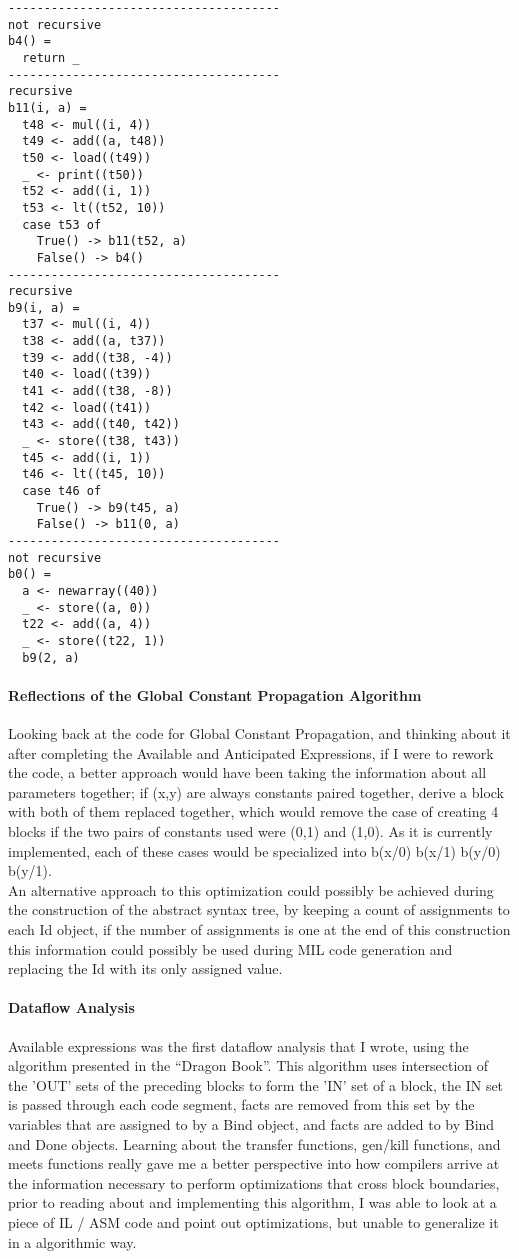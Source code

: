 \documentclass[14pt]{article}
\begin{document}
\begin{verbatim}
--------------------------------------
not recursive
b4() =
  return _
--------------------------------------
recursive
b11(i, a) =
  t48 <- mul((i, 4))
  t49 <- add((a, t48))
  t50 <- load((t49))
  _ <- print((t50))
  t52 <- add((i, 1))
  t53 <- lt((t52, 10))
  case t53 of
    True() -> b11(t52, a)
    False() -> b4()
--------------------------------------
recursive
b9(i, a) =
  t37 <- mul((i, 4))
  t38 <- add((a, t37))
  t39 <- add((t38, -4))
  t40 <- load((t39))
  t41 <- add((t38, -8))
  t42 <- load((t41))
  t43 <- add((t40, t42))
  _ <- store((t38, t43))
  t45 <- add((i, 1))
  t46 <- lt((t45, 10))
  case t46 of
    True() -> b9(t45, a)
    False() -> b11(0, a)
--------------------------------------
not recursive
b0() =
  a <- newarray((40))
  _ <- store((a, 0))
  t22 <- add((a, 4))
  _ <- store((t22, 1))
  b9(2, a)
\end{verbatim}
\paragraph{Reflections of the Global Constant Propagation Algorithm} Looking back at the code for Global Constant Propagation, and thinking about it after completing the Available and Anticipated Expressions, if I were to rework the code, a better approach would have been taking the information about all parameters together; if (x,y) are always constants paired together, derive a block with both of them replaced together, which would remove the case of creating 4 blocks if the two pairs of constants used were (0,1) and (1,0). As it is currently implemented, each of these cases would be specialized into b(x/0) b(x/1) b(y/0) b(y/1).\\
An alternative approach to this optimization could possibly be achieved during the construction of the abstract syntax tree, by keeping a count of assignments to each Id object, if the number of assignments is one at the end of this construction this information could possibly be used during MIL code generation and replacing the Id with its only assigned value.

\paragraph{Dataflow Analysis}
Available expressions was the first dataflow analysis that I wrote, using the algorithm presented in the ``Dragon Book''. This algorithm uses intersection of the 'OUT' sets of the preceding blocks to form the 'IN' set of a block, the IN set is passed through each code segment, facts are removed from this set by the variables that are assigned to by a Bind object, and facts are added to by Bind and Done objects. Learning about the transfer functions, gen/kill functions, and meets functions really gave me a better perspective into how compilers arrive at the information necessary to perform optimizations that cross block boundaries, prior to reading about and implementing this algorithm, I was able to look at a piece of IL / ASM code and point out optimizations, but unable to generalize it in a algorithmic way.
\end{document}
